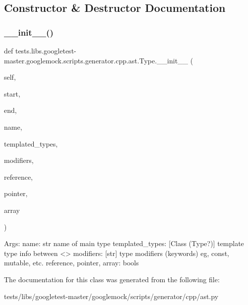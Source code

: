 \subsection{Constructor \& Destructor Documentation}
\mbox{\label{classtests_1_1libs_1_1googletest-master_1_1googlemock_1_1scripts_1_1generator_1_1cpp_1_1ast_1_1Type_a3d587dda6596af327d07e64e726f44a0}} 
\subsubsection{\texorpdfstring{\+\_\+\+\_\+init\+\_\+\+\_\+()}{\_\_init\_\_()}}
{\footnotesize\ttfamily def tests.\+libs.\+googletest-\/master.\+googlemock.\+scripts.\+generator.\+cpp.\+ast.\+Type.\+\_\+\+\_\+init\+\_\+\+\_\+ (\begin{DoxyParamCaption}\item[{}]{self,  }\item[{}]{start,  }\item[{}]{end,  }\item[{}]{name,  }\item[{}]{templated\+\_\+types,  }\item[{}]{modifiers,  }\item[{}]{reference,  }\item[{}]{pointer,  }\item[{}]{array }\end{DoxyParamCaption})}

\begin{DoxyVerb}Args:
  name: str name of main type
  templated_types: [Class (Type?)] template type info between <>
  modifiers: [str] type modifiers (keywords) eg, const, mutable, etc.
  reference, pointer, array: bools
\end{DoxyVerb}
 

The documentation for this class was generated from the following file\+:\begin{DoxyCompactItemize}
\item 
tests/libs/googletest-\/master/googlemock/scripts/generator/cpp/ast.\+py\end{DoxyCompactItemize}

